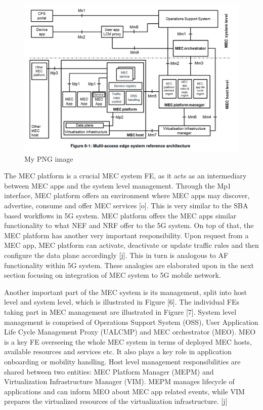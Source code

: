 \documentclass[12pt,a4paper,twoside]{report}
\begin{document}
\begin{figure}[ht]
	\centering
	\includegraphics[width=\textwidth]{./images/MEC-ref-arch.png}
	\caption{My PNG image}
\end{figure}

The MEC platform is a crucial MEC system FE, as it acts as an intermediary between MEC apps and the system level management. Through the Mp1 interface, MEC platform offers an environment where MEC apps may discover, advertise, consume and offer MEC services [o]. This is very similar to the SBA based workflows in 5G system. MEC platform offers the MEC apps similar functionality to what NEF and NRF offer to the 5G system. On top of that, the MEC platform has another very important responsibility. Upon request from a MEC app, MEC platform can activate, deactivate or update traffic rules and then configure the data plane accordingly [j]. This in turn is analogous to AF functionality within 5G system. These analogies are elaborated upon in the next section focusing on integration of MEC system to 5G mobile network. 

Another important part of the MEC system is its management, split into host level and system level, which is illustrated in Figure [6]. The individual FEs taking part in MEC management are illustrated in Figure [7]. System level management is comprised of Operations Support System (OSS), User Application Life Cycle Management Proxy (UALCMP) and MEC orchestrator (MEO). MEO is a key FE overseeing the whole MEC system in terms of deployed MEC hosts, available resources and services etc. It also plays a key role in application onboarding or mobility handling. Host level management responsibilities are shared between two entities: MEC Platform Manager (MEPM) and Virtualization Infrastructure Manager (VIM). MEPM manages lifecycle of applications and can inform MEO about MEC app related events, while VIM prepares the virtualized resources of the virtualization infrastructure. [j] 
\end{document}
